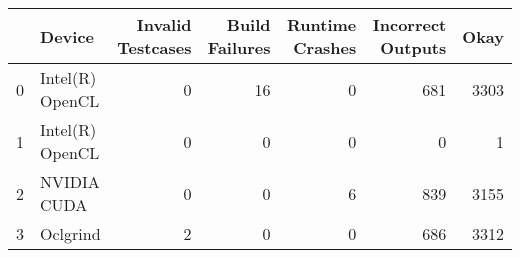\begin{tabular}{llrrrrr}
\toprule
{} &           Device &  Invalid Testcases &  Build Failures &  Runtime Crashes &  Incorrect Outputs &  Okay \\
\midrule
0 &  Intel(R) OpenCL &                  0 &              16 &                0 &                681 &  3303 \\
1 &  Intel(R) OpenCL &                  0 &               0 &                0 &                  0 &     1 \\
2 &      NVIDIA CUDA &                  0 &               0 &                6 &                839 &  3155 \\
3 &         Oclgrind &                  2 &               0 &                0 &                686 &  3312 \\
\bottomrule
\end{tabular}
